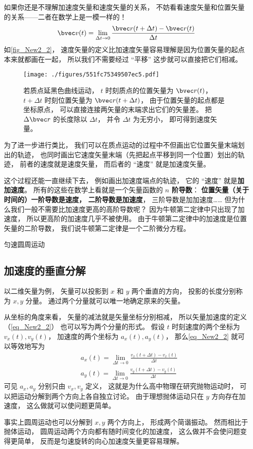如果你还是不理解加速度矢量和速度矢量的关系， 不妨看看速度矢量和位置矢量的关系——二者在数学上是一模一样的！
\begin{equation}
\bvec v(t) = \lim_{\Delta t\to 0}\frac{\bvec r(t+\Delta t) - \bvec r(t)}{\Delta t}
\end{equation}
如\autoref{fig_New2_2}， 速度矢量的定义比加速度矢量容易理解是因为位置矢量的起点本来就都画在一起， 所以我们不需要经过 “平移” 这步就可以直接把它们相减。
\begin{figure}[ht]
\centering
\texttt{[image: ./figures/551fc75349507ec5.pdf]}
\caption{若质点延黑色曲线运动， $t$ 时刻质点的位置矢量为 $\bvec r(t)$，$t+\Delta t$ 时刻位置矢量为 $\bvec r(t+\Delta t)$， 由于位置矢量的起点都是坐标原点， 可以直接连接两矢量的末端求出它们的矢量差。 把 $\Delta \bvec r$ 的长度除以 $\Delta t$， 并令 $\Delta t$ 为无穷小， 即可得到速度矢量。} \label{fig_New2_2}
\end{figure}

为了进一步进行类比， 我们可以在质点运动的过程中不但画出它位置矢量末端划出的轨迹， 也同时画出它速度矢量末端（先把起点平移到同一个位置）划出的轨迹， 前者的速度就是速度矢量， 而后者的 “速度” 就是加速度矢量。

这个过程还能一直继续下去， 例如画出加速度端点的轨迹， 它的 “速度” 就是\textbf{加加速度}。 所有的这些在数学上看就是一个矢量函数的\textbf{ $n$ 阶导数}： \textbf{位置矢量（关于时间的）一阶导数是速度， 二阶导数是加速度}， 三阶导数是加加速度…… 但为什么我们一般不需要比加速度更高的高阶导数呢？ 因为牛顿第二定律中只出现了加速度， 所以更高阶的加速度几乎不被使用。 由于牛顿第二定律中的加速度是位置矢量的二阶导数， 我们说牛顿第二定律是一个二阶微分方程。

\begin{example}{匀速圆周运动}
\end{example}

\subsection{加速度的垂直分解}

以二维矢量为例， 矢量可以投影到 $x$ 和 $y$ 两个垂直的方向， 投影的长度分别称为 $x, y$ 分量。 通过两个分量就可以唯一地确定原来的矢量。

从坐标的角度来看， 矢量的减法就是矢量坐标分别相减， 所以矢量加速度的定义（\autoref{eq_New2_2}） 也可以写为两个分量的形式。 假设 $t$ 时刻速度的两个坐标为 $v_x(t), v_y(t)$， 加速度的两个坐标为 $a_x(t), a_y(t)$， 那么\autoref{eq_New2_2} 就可以等效地写为
\begin{equation}
\begin{aligned}
&a_x(t) = \lim_{\Delta t\to 0}\frac{v_x(t+\Delta t) - v_x(t)}{\Delta t}\\
&a_y(t) = \lim_{\Delta t\to 0}\frac{v_y(t+\Delta t) - v_y(t)}{\Delta t}
\end{aligned}
\end{equation}
可见 $a_x,a_y$ 分别只由 $v_x,v_y$ 定义， 这就是为什么高中物理在研究抛物运动时， 可以把运动分解到两个方向上各自独立讨论。 由于理想抛体运动只在 $y$ 方向存在加速度， 这么做就可以使问题更简单。

事实上圆周运动也可以分解到 $x,y$ 两个方向上， 形成两个简谐振动。 然而相比于抛体运动， 圆周运动两个方向都有随时间变化的加速度， 这么做并不会使问题变得更简单， 反而是匀速旋转的向心加速度矢量更容易理解。
